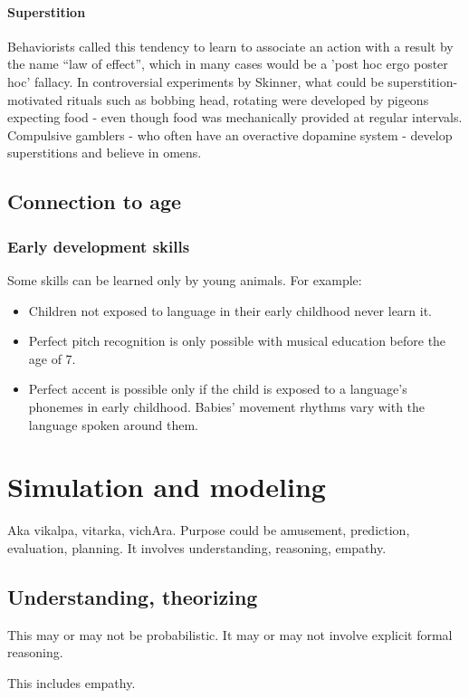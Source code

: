 \documentclass[oneside, article]{memoir}
\begin{document}
\subsubsection{Superstition}
Behaviorists called this tendency to learn to associate an action with a result by the name ``law of effect'', which in many cases would be a 'post hoc ergo poster hoc' fallacy. In controversial experiments by Skinner, what could be superstition-motivated rituals such as bobbing head, rotating were developed by pigeons expecting food - even though food was mechanically provided at regular intervals. Compulsive gamblers - who often have an overactive dopamine system - develop superstitions and believe in omens.

\section{Connection to age}
\subsection{Early development skills}
Some skills can be learned only by young animals. For example:

\begin{itemize}
\item Children not exposed to language in their early childhood never learn it.
\item Perfect pitch recognition is only possible with musical education before the age of 7.
\item Perfect accent is possible only if the child is exposed to a language's phonemes in early childhood. Babies' movement rhythms vary with the language spoken around them.
\end{itemize}


\chapter{Simulation and modeling}
Aka vikalpa, vitarka, vichAra. Purpose could be amusement, prediction, evaluation, planning. It involves understanding, reasoning, empathy.

\section{Understanding, theorizing}
This may or may not be probabilistic. It may or may not involve explicit formal reasoning.

This includes empathy.
\end{document}
